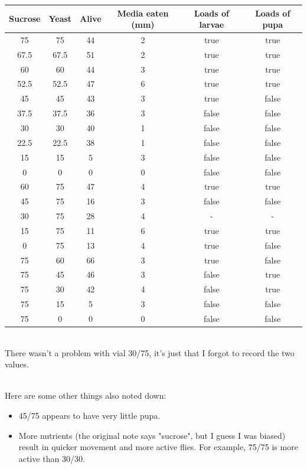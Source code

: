 \documentclass{article}
\begin{document}
{
\centering
\begin{tabular}{|c|c|c|c|c|c|}
  \hline
  Sucrose & Yeast & Alive & Media eaten (mm) & Loads of larvae & Loads of pupa\\
  \hline
  \hline
  75 & 75 & 44 & 2 & true & true\\
  67.5 & 67.5 & 51 & 2 & true & true\\
  60 & 60 & 44 & 3 & true & true\\
  52.5 & 52.5 & 47 & 6 & true & true\\
  45 & 45 & 43 & 3 & true & false\\
  37.5 & 37.5 & 36 & 3 & false & false\\
  30 & 30 & 40 & 1 & false & false\\
  22.5 & 22.5 & 38 & 1 & false & false\\
  15 & 15 & 5 & 3 & false & false\\
  0 & 0 & 0 & 0 & false & false\\
  \hline
  60 & 75 & 47 & 4 & true & true\\
  45 & 75 & 16 & 3 & false & false\\
  30 & 75 & 28 & 4 & - & -\\
  15 & 75 & 11 & 6 & true & true\\
  0 & 75 & 13 & 4 & true & false\\
  \hline
  75 & 60 & 66 & 3 & true & false\\
  75 & 45 & 46 & 3 & false & true\\
  75 & 30 & 42 & 4 & false & true\\
  75 & 15 & 5 & 3 & false & false\\
  75 & 0 & 0 & 0 & false & false\\
  \hline
\end{tabular}
\par
}

\noindent\\
There wasn't a problem with vial 30/75, it's just that I forgot to record the two values.

\noindent\\
Here are some other things also noted down:

\begin{itemize}
  \item 45/75 appears to have very little pupa.
  \item More nutrients (the original note says "sucrose", but I guess I was biased) result in quicker movement and more active flies. For example, 75/75 is more active than 30/30.
\end{itemize}
\end{document}
